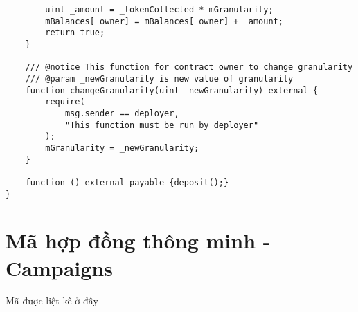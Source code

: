 \documentclass[../main-report.tex]{subfiles}
\begin{document}
\begin{lstlisting}
        uint _amount = _tokenCollected * mGranularity;
        mBalances[_owner] = mBalances[_owner] + _amount;
        return true;
    }

    /// @notice This function for contract owner to change granularity
    /// @param _newGranularity is new value of granularity
    function changeGranularity(uint _newGranularity) external {
        require(
            msg.sender == deployer,
            "This function must be run by deployer"
        );
        mGranularity = _newGranularity;
    }

    function () external payable {deposit();}
}
\end{lstlisting}

\chapter{Mã hợp đồng thông minh - Campaigns}
Mã được liệt kê ở đây
\end{document}
